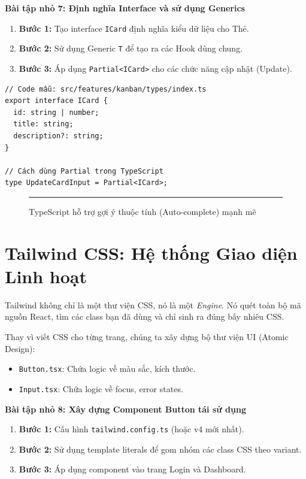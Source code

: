 \textbf{Bài tập nhỏ 7: Định nghĩa Interface và sử dụng Generics}
\begin{enumerate}
    \item \textbf{Bước 1:} Tạo interface \texttt{ICard} định nghĩa kiểu dữ liệu cho Thẻ.
    \item \textbf{Bước 2:} Sử dụng Generic \texttt{T} để tạo ra các Hook dùng chung.
    \item \textbf{Bước 3:} Áp dụng \texttt{Partial<ICard>} cho các chức năng cập nhật (Update).
\end{enumerate}

\begin{Verbatim}
// Code mẫu: src/features/kanban/types/index.ts
export interface ICard {
  id: string | number;
  title: string;
  description?: string;
}

// Cách dùng Partial trong TypeScript
type UpdateCardInput = Partial<ICard>;
\end{Verbatim}

\begin{figure}[H]
    \centering
    \rule{0.8\textwidth}{0.3\textwidth}
    \caption{TypeScript hỗ trợ gợi ý thuộc tính (Auto-complete) mạnh mẽ}
\end{figure}


\section{Tailwind CSS: Hệ thống Giao diện Linh hoạt}
Tailwind không chỉ là một thư viện CSS, nó là một \textit{Engine}. Nó quét toàn bộ mã nguồn React, tìm các class bạn đã dùng và chỉ sinh ra đúng bấy nhiêu CSS.

Thay vì viết CSS cho từng trang, chúng ta xây dựng bộ thư viện UI (Atomic Design):
\begin{itemize}
    \item \texttt{Button.tsx}: Chứa logic về màu sắc, kích thước.
    \item \texttt{Input.tsx}: Chứa logic về focus, error states.
\end{itemize}

\textbf{Bài tập nhỏ 8: Xây dựng Component Button tái sử dụng}
\begin{enumerate}
    \item \textbf{Bước 1:} Cấu hình \texttt{tailwind.config.ts} (hoặc v4 mới nhất).
    \item \textbf{Bước 2:} Sử dụng template literals để gom nhóm các class CSS theo variant.
    \item \textbf{Bước 3:} Áp dụng component vào trang Login và Dashboard.
\end{enumerate}

